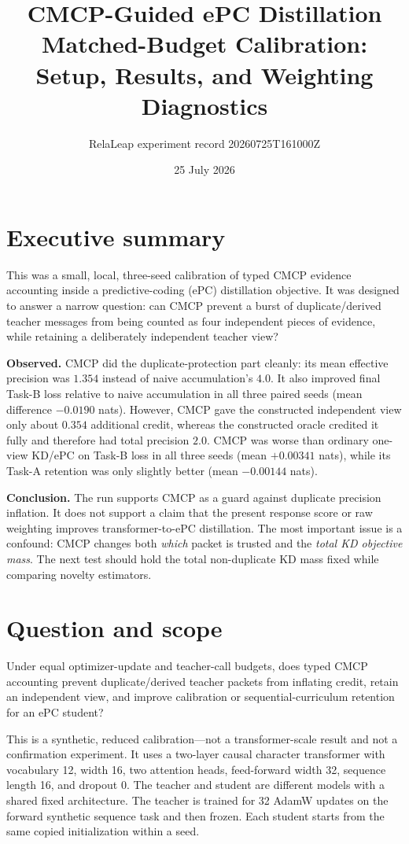 \documentclass[10pt]{article}
\title{CMCP-Guided ePC Distillation\\\large Matched-Budget Calibration: Setup, Results, and Weighting Diagnostics}
\author{RelaLeap experiment record 20260725T161000Z}
\date{25 July 2026}
\begin{document}
\maketitle

\section*{Executive summary}

This was a small, local, three-seed calibration of typed CMCP evidence
accounting inside a predictive-coding (ePC) distillation objective. It was
designed to answer a narrow question: can CMCP prevent a burst of
duplicate/derived teacher messages from being counted as four independent
pieces of evidence, while retaining a deliberately independent teacher view?

\textbf{Observed.} CMCP did the duplicate-protection part cleanly: its mean
effective precision was $1.354$ instead of naive accumulation's $4.0$. It
also improved final Task-B loss relative to naive accumulation in all three
paired seeds (mean difference $-0.0190$ nats). However, CMCP gave the
constructed independent view only about $0.354$ additional credit, whereas
the constructed oracle credited it fully and therefore had total precision
$2.0$. CMCP was worse than ordinary one-view KD/ePC on Task-B loss in all
three seeds (mean $+0.00341$ nats), while its Task-A retention was only
slightly better (mean $-0.00144$ nats).

\textbf{Conclusion.} The run supports CMCP as a guard against duplicate
precision inflation. It does not support a claim that the present response
score or raw weighting improves transformer-to-ePC distillation. The most
important issue is a confound: CMCP changes both \emph{which} packet is
trusted and the \emph{total KD objective mass}. The next test should hold the
total non-duplicate KD mass fixed while comparing novelty estimators.

\section*{Question and scope}

Under equal optimizer-update and teacher-call budgets, does typed CMCP
accounting prevent duplicate/derived teacher packets from inflating credit,
retain an independent view, and improve calibration or sequential-curriculum
retention for an ePC student?

This is a synthetic, reduced calibration---not a transformer-scale result and
not a confirmation experiment. It uses a two-layer causal character
transformer with vocabulary 12, width 16, two attention heads, feed-forward
width 32, sequence length 16, and dropout 0. The teacher and student are
different models with a shared fixed architecture. The teacher is trained for
32 AdamW updates on the forward synthetic sequence task and then frozen. Each
student starts from the same copied initialization within a seed.
\end{document}
